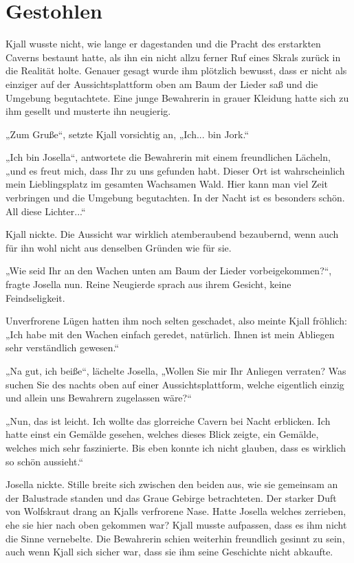\newpage
\section{Gestohlen}

Kjall wusste nicht, wie lange er dagestanden und die Pracht des erstarkten Caverns bestaunt hatte, als ihn ein nicht allzu ferner Ruf eines Skrals zurück in die Realität holte. Genauer gesagt wurde ihm plötzlich bewusst, dass er nicht als einziger auf der Aussichtsplattform oben am Baum der Lieder saß und die Umgebung begutachtete. Eine junge Bewahrerin in grauer Kleidung hatte sich zu ihm gesellt und musterte ihn neugierig.

„Zum Gruße“, setzte Kjall vorsichtig an, „Ich... bin Jork.“

„Ich bin Josella“, antwortete die Bewahrerin mit einem freundlichen Lächeln, „und es freut mich, dass Ihr zu uns gefunden habt. Dieser Ort ist wahrscheinlich mein Lieblingsplatz im gesamten Wachsamen Wald. Hier kann man viel Zeit verbringen und die Umgebung begutachten. In der Nacht ist es besonders schön. All diese Lichter...“

Kjall nickte. Die Aussicht war wirklich atemberaubend bezaubernd, wenn auch für ihn wohl nicht aus denselben Gründen wie für sie.

„Wie seid Ihr an den Wachen unten am Baum der Lieder vorbeigekommen?“, fragte Josella nun. Reine Neugierde sprach aus ihrem Gesicht, keine Feindseligkeit.

Unverfrorene Lügen hatten ihm noch selten geschadet, also meinte Kjall fröhlich: „Ich habe mit den Wachen einfach geredet, natürlich. Ihnen ist mein Abliegen sehr verständlich gewesen.“

„Na gut, ich beiße“, lächelte Josella, „Wollen Sie mir Ihr Anliegen verraten? Was suchen Sie des nachts oben auf einer Aussichtsplattform, welche eigentlich einzig und allein uns Bewahrern zugelassen wäre?“

„Nun, das ist leicht. Ich wollte das glorreiche Cavern bei Nacht erblicken. Ich hatte einst ein Gemälde gesehen, welches dieses Blick zeigte, ein Gemälde, welches mich sehr faszinierte. Bis eben konnte ich nicht glauben, dass es wirklich so schön aussieht.“

Josella nickte. Stille breite sich zwischen den beiden aus, wie sie gemeinsam an der Balustrade standen und das Graue Gebirge betrachteten. Der starker Duft von Wolfskraut drang an Kjalls verfrorene Nase. Hatte Josella welches zerrieben, ehe sie hier nach oben gekommen war? Kjall musste aufpassen, dass es ihm nicht die Sinne vernebelte. Die Bewahrerin schien weiterhin freundlich gesinnt zu sein, auch wenn Kjall sich sicher war, dass sie ihm seine Geschichte nicht abkaufte.

